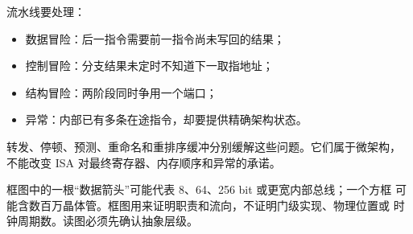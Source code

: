 流水线要处理：

\begin{itemize}[leftmargin=2.2em]
  \item 数据冒险：后一指令需要前一指令尚未写回的结果；
  \item 控制冒险：分支结果未定时不知道下一取指地址；
  \item 结构冒险：两阶段同时争用一个端口；
  \item 异常：内部已有多条在途指令，却要提供精确架构状态。
\end{itemize}

转发、停顿、预测、重命名和重排序缓冲分别缓解这些问题。它们属于微架构，
不能改变 ISA 对最终寄存器、内存顺序和异常的承诺。

\begin{failurebox}
框图中的一根“数据箭头”可能代表 8、64、256 bit 或更宽内部总线；一个方框
可能含数百万晶体管。框图用来证明职责和流向，不证明门级实现、物理位置或
时钟周期数。读图必须先确认抽象层级。
\end{failurebox}

